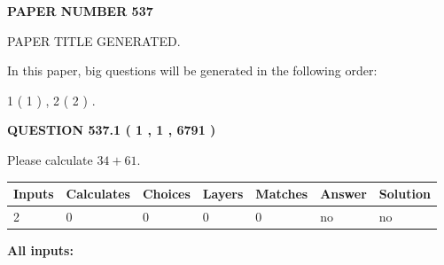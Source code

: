 \documentclass[12pt]{article}
\begin{document}
   
   
   
\newpage 
\setcounter{page}{ 
   537001 } 
   
   
   
   
 {\textbf{ \Large{ PAPER NUMBER  537  }}}
   
   
\vspace{0.2in}
   
   
   
   
   
   
   
   
 \vspace{0.2in}
 
 
 
 
   
   
 PAPER TITLE GENERATED.
   
   
   
\vspace{0.2in}
   
In this paper, big questions will be generated in the following order: 
   
   
   1 ( 1 )
 ,
   2 ( 2 )
 .
  
\vspace{0.2in}
  
{\textbf{\Large{QUESTION
537.1 
 ( 1 , 1 , 6791 )
}}}
  
  
 
Please calculate $ %
34 +  %
61 $.
 
 
   
   
   
   
\noindent\begin{tabular}{|l|l|l|l|l|l|l|}
 \hline
Inputs & Calculates & Choices & Layers & Matches & Answer & Solution \\ \hline
 2  & 
 0  & 
 0
  & 
 0  & 
 0  & 
  no & 
  no 
  \\ \hline
 \end{tabular}
   
   
   
   
\noindent{}
   
   
   
   
\noindent\vspace{0.1in}\hspace{-0.08in} {\textbf{\Large{All inputs: }}}
   
   
  
\end{document}
